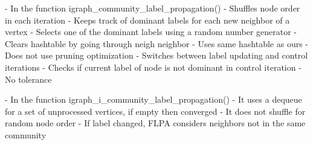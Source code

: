 - In the function igraph\_community\_label\_propagation()
- Shuffles node order in each iteration
- Keeps track of dominant labels for each new neighbor of a vertex
- Selects one of the dominant labels using a random number generator
- Clears hashtable by going through neigh neighbor
- Uses same hashtable as ours
- Does not use pruning optimization
- Switches between label updating and control iterations
- Checks if current label of node is not dominant in control iteration
- No tolerance


- In the function igraph\_i\_community\_label\_propagation()
- It uses a dequeue for a set of unprocessed vertices, if empty then converged
- It does not shuffle for random node order
- If label changed, FLPA considers neighbors not in the same community









